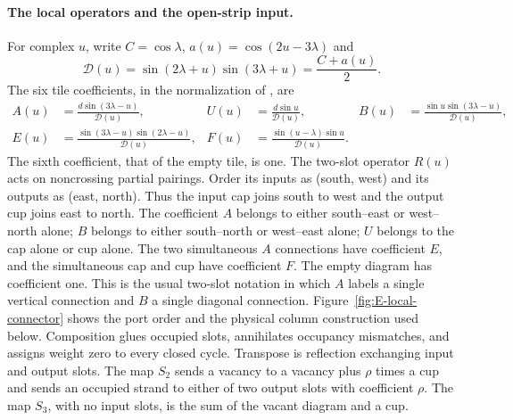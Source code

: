 \paragraph{The local operators and the open-strip input.}
For complex $u$, write $C=\cos\lambda$, $a(u)=\cos(2u-3\lambda)$ and
\[
 \mathscr D(u)=\sin(2\lambda+u)\sin(3\lambda+u)=\frac{C+a(u)}2.
\]
The six tile coefficients, in the normalization of
\cite[equation (1)]{GM2019}, are
\begin{equation}\label{eq:E-local-weights}
\begin{aligned}
 A(u)&=\frac{d\sin(3\lambda-u)}{\mathscr D(u)},&
 U(u)&=\frac{d\sin u}{\mathscr D(u)},&
 B(u)&=\frac{\sin u\sin(3\lambda-u)}{\mathscr D(u)},\\
 E(u)&=\frac{\sin(3\lambda-u)\sin(2\lambda-u)}{\mathscr D(u)},&
 F(u)&=\frac{\sin(u-\lambda)\sin u}{\mathscr D(u)}.
\end{aligned}
\end{equation}
The sixth coefficient, that of the empty tile, is one. The two-slot
operator $R(u)$ acts on noncrossing partial pairings. Order its inputs
as (south, west) and its outputs as (east, north). Thus the input cap
joins south to west and the output cup joins east to north. The
coefficient $A$ belongs to either south--east or west--north alone;
$B$ belongs to either south--north or west--east alone; $U$ belongs to
the cap alone or cup alone. The two simultaneous $A$ connections have
coefficient $E$, and the simultaneous cap and cup have coefficient $F$.
The empty diagram has coefficient one. This is the usual two-slot
notation in which $A$ labels a single vertical connection and $B$ a
single diagonal connection. Figure~\ref{fig:E-local-connector} shows
the port order and the physical column construction used below. Composition
glues occupied slots, annihilates occupancy mismatches, and assigns
weight zero to every closed cycle. Transpose is reflection exchanging
input and output slots. The map $S_2$ sends a vacancy to a vacancy plus
$\rho$ times a cup and sends an occupied strand to either of two output
slots with coefficient $\rho$. The map $S_3$, with no input slots,
is the sum of the vacant diagram and a cup.

